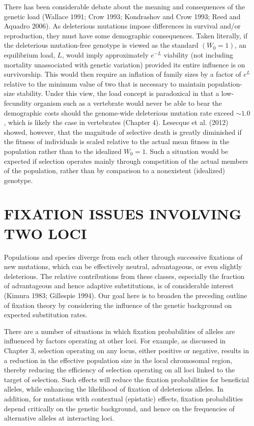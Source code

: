 \documentclass{article}
\begin{document}
There has been considerable debate about the meaning and consequences of the genetic load (Wallace 1991; Crow 1993; Kondrashov and Crow 1993; Reed and Aquadro 2006). As deleterious mutations impose differences in survival and/or reproduction, they must have some demographic consequences. Taken literally, if the deleterious mutation-free genotype is viewed as the standard  $ (W_0 = 1) $, an equilibrium load,  $ L $, would imply approximately  $ e^{-L} $ viability (not including mortality unassociated with genetic variation) provided its entire influence is on survivorship. This would then require an inflation of family sizes by a factor of  $ e^L $ relative to the minimum value of two that is necessary to maintain population-size stability. Under this view, the load concept is paradoxical in that a low-fecundity organism such as a vertebrate would never be able to bear the demographic costs should the genome-wide deleterious mutation rate exceed  $ \sim1.0 $, which is likely the case in vertebrates (Chapter 4). Lesecque et al. (2012) showed, however, that the magnitude of selective death is greatly diminished if the fitness of individuals is scaled relative to the actual mean fitness in the population rather than to the idealized  $ W_0 = 1 $. Such a situation would be expected if selection operates mainly through competition of the actual members of the population, rather than by comparison to a nonexistent (idealized) genotype.

\section{FIXATION ISSUES INVOLVING TWO LOCI}
Populations and species diverge from each other through successive fixations of new mutations, which can be effectively neutral, advantageous, or even slightly deleterious. The relative contributions from these classes, especially the fraction of advantageous and hence adaptive substitutions, is of considerable interest (Kimura 1983; Gillespie 1994). Our goal here is to broaden the preceding outline of fixation theory by considering the influence of the genetic background on expected substitution rates.

There are a number of situations in which fixation probabilities of alleles are influenced by factors operating at other loci. For example, as discussed in Chapter 3, selection operating on any locus, either positive or negative, results in a reduction in the effective population size in the local chromosomal region, thereby reducing the efficiency of selection operating on all loci linked to the target of selection. Such effects will reduce the fixation probabilities for beneficial alleles, while enhancing the likelihood of fixation of deleterious alleles. In addition, for mutations with contextual (epistatic) effects, fixation probabilities depend critically on the genetic background, and hence on the frequencies of alternative alleles at interacting loci.
\end{document}
